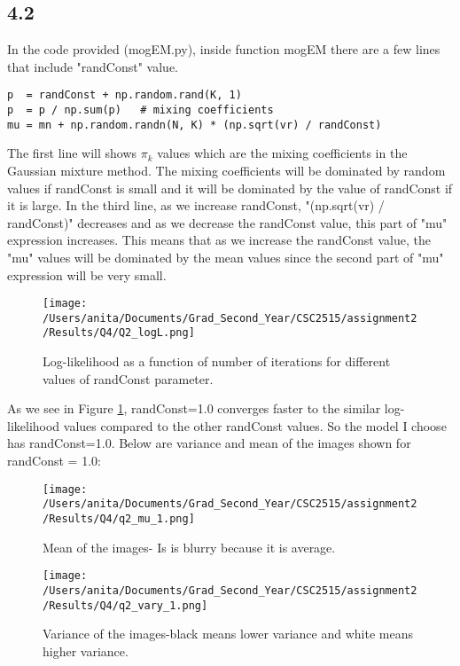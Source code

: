 \documentclass[10pt]{article}
\begin{document}
\subsection*{4.2}
In the code provided (mogEM.py), inside function mogEM there are a few lines that include "randConst" value.
\begin{verbatim}
p  = randConst + np.random.rand(K, 1)
p  = p / np.sum(p)   # mixing coefficients
mu = mn + np.random.randn(N, K) * (np.sqrt(vr) / randConst)
\end{verbatim}
The first line will shows $\pi_k$ values which are the mixing coefficients in the Gaussian mixture method. The mixing coefficients will be dominated by random values if randConst is small and it will be dominated by the value of randConst if it is large.
In the third line, as we increase randConst, "(np.sqrt(vr) / randConst)" decreases and as we decrease the randConst value, this part of "mu" expression increases. This means that as we increase the randConst value, the "mu" values will be dominated by the mean values since the second part of "mu" expression will be very small.


\begin{figure}[H]
	\centering
	\texttt{[image: /Users/anita/Documents/Grad\_Second\_Year/CSC2515/assignment2/Results/Q4/Q2\_logL.png]}
	\caption{Log-likelihood as a function of number of iterations for different values of randConst parameter.}
	\label{fig:q4_log_iter}
\end{figure}
As we see in Figure \ref{fig:q4_log_iter}, randConst=1.0 converges faster to the similar log-likelihood values compared to the other randConst values. So the model I choose has randConst=1.0.
Below are variance and mean of the images shown for randConst = 1.0:
\begin{figure}[H]
	\centering
	\texttt{[image: /Users/anita/Documents/Grad\_Second\_Year/CSC2515/assignment2/Results/Q4/q2\_mu\_1.png]}
	\caption{Mean of the images- Is is blurry because it is average.}
	\label{fig:q4.2_mu}
\end{figure}

\begin{figure}[H]
	\centering
	\texttt{[image: /Users/anita/Documents/Grad\_Second\_Year/CSC2515/assignment2/Results/Q4/q2\_vary\_1.png]}
	\caption{Variance of the images-black means lower variance and white means higher variance.}
	\label{fig:q4.2_vary}
\end{figure}
\end{document}
